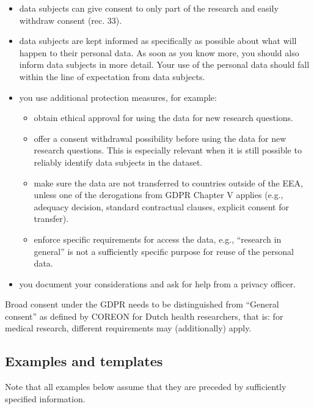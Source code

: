 \documentclass[
]{book}
\providecommand{\tightlist}{%
  \setlength{\itemsep}{0pt}\setlength{\parskip}{0pt}}
\begin{document}
\begin{itemize}
\tightlist
\item
  data subjects can give consent to only part of the research and easily
  withdraw consent
  (rec. 33).
\item
  data subjects are kept informed as specifically as possible about what will
  happen to their personal data. As soon as you know more, you should also inform
  data subjects in more detail. Your use of the personal data should fall within
  the line of expectation from data subjects.
\item
  you use additional protection measures, for example:

  \begin{itemize}
  \tightlist
  \item
    obtain ethical approval for using the data for new research questions.
  \item
    offer a consent withdrawal possibility before using the data for new research
    questions. This is especially relevant when it is still possible to reliably
    identify data subjects in the dataset.
  \item
    make sure the data are not transferred to countries outside of the EEA,
    unless one of the derogations from GDPR
    Chapter V
    applies (e.g., adequacy decision, standard contractual clauses, explicit
    consent for transfer).
  \item
    enforce specific requirements for access the data, e.g., ``research in general''
    is not a sufficiently specific purpose for reuse of the personal data.
  \end{itemize}
\item
  you document your considerations and ask for help from a
  privacy officer.
\end{itemize}

Broad consent under the GDPR needs to be distinguished from ``General consent''
as defined by
COREON for Dutch health researchers, that is: for medical research, different requirements may
(additionally) apply.

\hypertarget{examples-and-templates}{%
\subsection{Examples and templates}\label{examples-and-templates}}

Note that all examples below assume that they are preceded by
sufficiently specified information.
\end{document}
